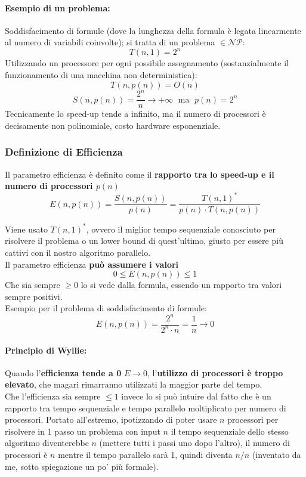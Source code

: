 \paragraph{Esempio di un problema:} Soddisfacimento di formule (dove la lunghezza della formula è legata linearmente al numero di variabili coinvolte); si tratta di un problema $\in \mathcal{NP}$:
$$ T(n,1) = 2^n$$
Utilizzando un processore per ogni possibile assegnamento (sostanzialmente il funzionamento di una macchina non deterministica): 
$$ T(n, p(n)) = O(n) $$
$$S(n, p(n)) = \frac{2^n}{n} \rightarrow +\infty \;\text{ ma }\; p(n) = 2^n$$
Tecnicamente lo speed-up tende a infinito, ma il numero di processori è decisamente non polinomiale, costo hardware esponenziale.

\newpage

\subsubsection{Definizione di Efficienza}
Il parametro efficienza è definito come il \textbf{rapporto tra lo speed-up e il numero di processori $p(n)$}
$$ E(n, p(n)) = \frac{S(n,p(n))}{p(n)} = \frac{T(n,1)^\ast}{p(n) \cdot T(n, p(n))}$$

Viene usato $T(n,1)^\ast$, ovvero il miglior tempo sequenziale conosciuto per risolvere il problema o un lower bound di quest'ultimo, giusto per essere più cattivi con il nostro algoritmo parallelo.\\

Il parametro efficienza \textbf{può assumere i valori}
$$ 0 \leq E(n, p(n)) \leq 1$$
Che sia sempre $\geq 0$ lo si vede dalla formula, essendo un rapporto tra valori sempre positivi.\\

Esempio per il problema di soddisfacimento di formule:
$$ E(n, p(n)) = \frac{2^n}{2^n \cdot n} = \frac{1}{n} \rightarrow 0 $$

\paragraph{Principio di Wyllie:} Quando l'\textbf{efficienza tende a 0} $E \rightarrow 0$, l'\textbf{utilizzo di processori è troppo elevato}, che magari rimarranno utilizzati la maggior parte del tempo.\\

Che l'efficienza sia sempre $\leq 1$ invece lo si può intuire dal fatto che è un rapporto tra tempo sequenziale e tempo parallelo moltiplicato per numero di processori. Portato all'estremo, ipotizzando di poter usare $n$ processori per risolvere in 1 passo un problema con input $n$ il tempo sequenziale dello stesso algoritmo diventerebbe $n$ (mettere tutti i passi uno dopo l'altro), il numero di processori è $n$ mentre il tempo parallelo sarà 1, quindi diventa $n/n$ (inventato da me, sotto spiegazione un po' più formale). \\

